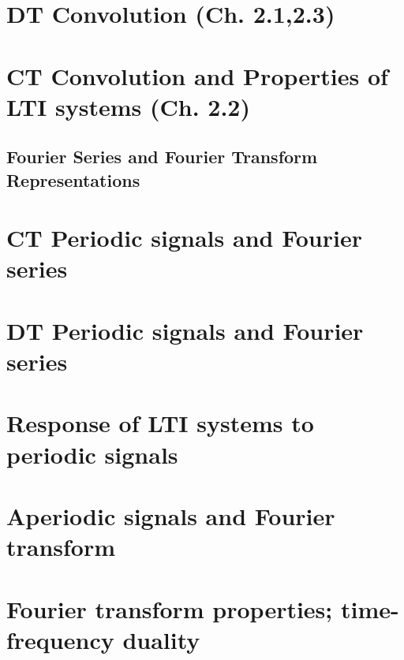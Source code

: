 \documentclass{article}
\begin{document}
\section{DT Convolution (Ch. 2.1,2.3)}


\newpage

\section{CT Convolution and Properties of LTI systems (Ch. 2.2)}

\newpage

\begin{center}
    \section*{Fourier Series and Fourier Transform Representations}
\end{center}
\section{CT Periodic signals and Fourier series}


\newpage

\section{DT Periodic signals and Fourier series}

\newpage

\section{Response of LTI systems to periodic signals}

\newpage

\section{Aperiodic signals and Fourier transform}

\newpage

\section{Fourier transform properties; time-frequency duality}

\newpage
\end{document}

